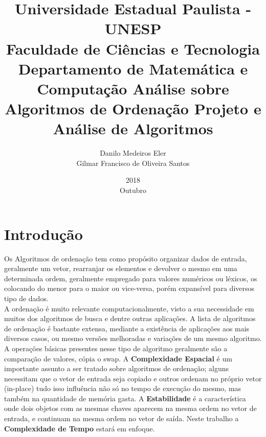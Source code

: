 \documentclass[10pt,a4paper]{article}
\author{\Large Danilo Medeiros Eler\\ \Large Gilmar Francisco de Oliveira Santos}
\title{Universidade Estadual Paulista - UNESP\\Faculdade de Ciências e Tecnologia\\Departamento de Matemática e Computação\linebreak \linebreak \linebreak \linebreak\linebreak \linebreak \linebreak \linebreak
        \Huge Análise sobre Algoritmos de Ordenação \linebreak \Large Projeto e Análise de Algoritmos\linebreak \linebreak \linebreak \linebreak\linebreak\linebreak\linebreak\linebreak\linebreak\linebreak\linebreak\linebreak\linebreak\linebreak\linebreak\linebreak\linebreak\linebreak\linebreak\linebreak\linebreak\linebreak}
\date{2018\\Outubro}
\begin{document}
\clearpage\maketitle
\thispagestyle{empty}

\newpage
\thispagestyle{empty}
\tableofcontents

\setlength{\parindent}{4ex}
\newpage
\pagestyle{fancyplain} 
\fancyhf{}
\rfoot{\thepage}

\section{Introdução}
    \doublespace
    \indent Os Algoritmos de ordenação tem como propósito organizar dados de entrada, geralmente um vetor, rearranjar os elementos e devolver o mesmo em uma determinada ordem, geralmente empregado para valores numéricos ou léxicos, os colocando do menor para o maior ou vice-versa, porém expansível  para diversos tipo de dados.\\
    \indent A ordenação é muito relevante computacionalmente, visto a sua necessidade em muitos dos algoritmos de busca e dentre outras aplicações. A lista de algoritmos de ordenação é bastante extensa, mediante a existência de aplicações aos mais diversos casos, ou mesmo versões melhoradas e variações de um mesmo algoritmo.\\
    \indent A operações básicas presentes nesse tipo de algoritmo geralmente são a comparação de valores, cópia o swap. A \textbf{Complexidade Espacial} é um importante assunto a ser tratado sobre algoritmos de ordenação; alguns necessitam que o vetor de entrada seja copiado e outros ordenam no próprio vetor (in-place) tudo isso influência não só no tempo de execução do mesmo, mas também na quantidade de memória gasta. A \textbf{Estabilidade} é a característica onde dois objetos com as mesmas chaves aparecem na mesma ordem no vetor de entrada, e continuam na mesma ordem no vetor de saída. Neste trabalho a \textbf{Complexidade de Tempo} estará em enfoque.

\newpage
\end{document}
